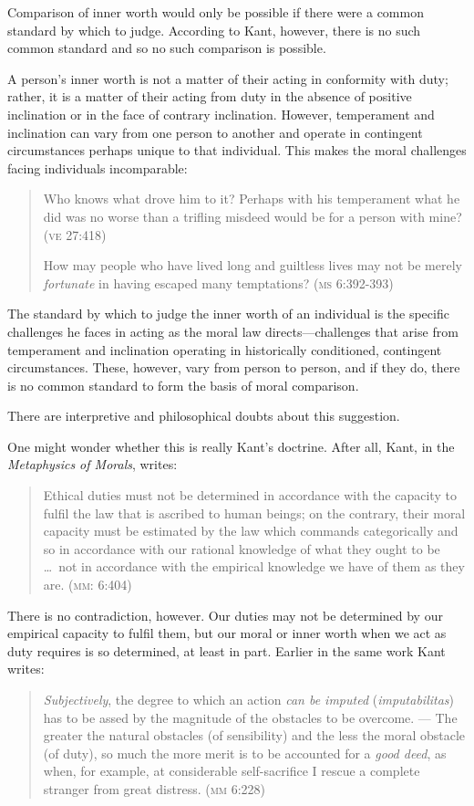 \documentclass[12pt]{article}
\begin{document}
Comparison of inner worth would only be possible if there were a common standard by which to judge. According to Kant, however, there is no such common standard and so no such comparison is possible.

A person's inner worth is not a matter of their acting in conformity with duty; rather, it is a matter of their acting from duty in the absence of positive inclination or in the face of contrary inclination. However, temperament and inclination can vary from one person to another and operate in contingent circumstances perhaps unique to that individual. This makes the moral challenges facing individuals incomparable: 
\begin{quote}
	Who knows what drove him to it? Perhaps with his temperament what he did was no worse than a trifling misdeed would be for a person with mine? (\textsc{ve} 27:418)
	
	How may people who have lived long and guiltless lives may not be merely \emph{fortunate} in having escaped many temptations? (\textsc{ms} 6:392-393) 
\end{quote}
The standard by which to judge the inner worth of an individual is the specific challenges he faces in acting as the moral law directs---challenges that arise from temperament and inclination operating in historically conditioned, contingent circumstances. These, however, vary from person to person, and if they do, there is no common standard to form the basis of moral comparison. 

There are interpretive and philosophical doubts about this suggestion.

One might wonder whether this is really Kant's doctrine. After all, Kant, in the \emph{Metaphysics of Morals}, writes:
\begin{quote}
	Ethical duties must not be determined in accordance with the capacity to fulfil the law that is ascribed to human beings; on the contrary, their moral capacity must be estimated by the law which commands categorically and so in accordance with our rational knowledge of what they ought to be \ldots\ not in accordance with the empirical knowledge we have of them as they are. (\textsc{mm}: 6:404)
\end{quote}
There is no contradiction, however. Our duties may not be determined by our empirical capacity to fulfil them, but our moral or inner worth when we act as duty requires is so determined, at least in part. Earlier in the same work Kant writes:
\begin{quote}
	\emph{Subjectively}, the degree to which an action \emph{can be imputed} (\emph{imputabilitas}) has to be assed by the magnitude of the obstacles to be overcome. --- The greater the natural obstacles (of sensibility) and the less the moral obstacle (of duty), so much the more merit is to be accounted for a \emph{good deed}, as when, for example, at considerable self-sacrifice I rescue a complete stranger from great distress. (\textsc{mm} 6:228)
\end{quote}
\end{document}
